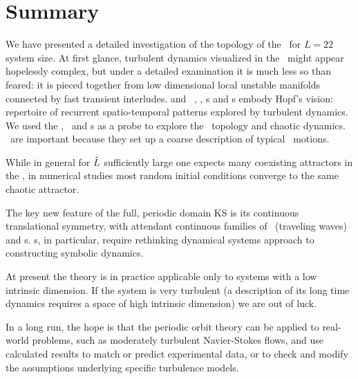 
\section{Summary}
\label{sect:rpo-sum}


We have presented a detailed investigation
of the topology of the
{\KS} \statesp\ for $L=22$ system size.
At first glance, turbulent dynamics visualized in the \statesp\ might appear
hopelessly complex, but under a detailed examination it is
much less so than feared: it is
pieced together from low dimensional %
local unstable manifolds connected by fast transient interludes.
{\KS} and \pCf\  \eqv, \reqv, \po s and 
\rpo s embody Hopf's vision:
repertoire of recurrent spatio-temporal
patterns explored by turbulent dynamics.
We used
the \eqva, \reqva\ and {\rpo}s as a probe to explore the
\statesp\  topology and chaotic dynamics.
\Eqva\ are important because they set up 
a coarse description of 
typical \statesp\ motions.

While in general
for $\tilde{L}$ sufficiently large
one expects many 
coexisting attractors in the \statesp%
,
in numerical studies most random initial
conditions converge to the same chaotic attractor. 

The key new feature of the full, periodic domain
KS is its continuous translational symmetry,
with attendant continuous families of
\reqva\ (traveling waves) and \rpo s.
\Rpo s, in particular, require rethinking dynamical systems
approach to constructing symbolic dynamics. 


At present the theory is in practice applicable only to systems
with a low intrinsic dimension.
If the system is very turbulent
(a description of its long time dynamics requires a space of high
intrinsic dimension) we are out of luck. 

In a long run, the hope is that the periodic orbit theory
can be applied to real-world
problems, such as moderately turbulent Navier-Stokes
flows, and use calculated results to match or predict
experimental data, or to check and modify the assumptions underlying specific
turbulence models.





